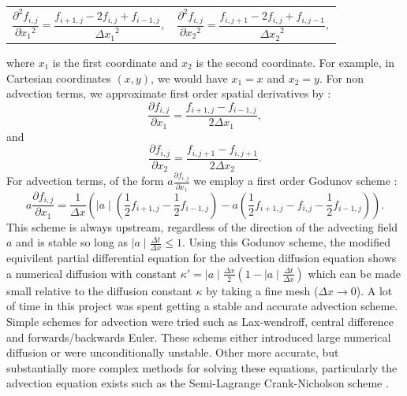 \documentclass{article}
\begin{document}
\begin{tabularx}{\textwidth}{XX}
\begin{equation}
	\frac{\partial^2 f_{i,j}}{\partial {x_1}^2} = \frac{f_{i+1,j} - 2 f_{i,j} + f_{i-1,j}}{{\Delta x_1}^2},
\end{equation}
    &
\begin{equation}
	\frac{\partial^2 f_{i,j}}{\partial {x_2}^2} = \frac{f_{i,j+1} - 2 f_{i,j} + f_{i,j-1}}{{\Delta x_2}^2},
\end{equation}
\end{tabularx}
where $x_1$ is the first coordinate and $x_2$ is the second coordinate. For example, in Cartesian coordinates $(x,y)$, we would have $x_1=x$ and $x_2=y$. 
For non advection terms, we approximate first order spatial derivatives by \cite{press1986numerical}:
\begin{equation}
	\frac{\partial f_{i,j}}{\partial x_1} = \frac{f_{i+1,j} - f_{i-1,j}}{2{\Delta x_1}},
\end{equation}
and
\begin{equation}
	\frac{\partial f_{i,j}}{\partial x_2} = \frac{f_{i,j+1} - f_{i,j+1}}{2{\Delta x_2}}.
\end{equation}
For advection terms, of the form $a \frac{\partial f_{i,j}}{\partial x_1}$ we employ a first order Godunov scheme \cite{godunov1959difference, guinot2003godunov}:
\begin{equation}
	a \frac{\partial f_{i,j}}{\partial x_1} = \frac{1}{\Delta x} ( \mid a\mid (  \frac{1}{2} f_{i+1,j} - \frac{1}{2} f_{i-1,j}   ) - a ( \frac{1}{2} f_{i+1,j} -f_{i,j} - \frac{1}{2} f_{i-1,j} )).
\end{equation}
This scheme is always upstream, regardless of the direction of the advecting field $a$ and is stable so long as $\mid a \mid \frac{\Delta t}{\Delta x} \leq 1$. Using this Godunov scheme, the modified equivilent partial differential equation for the advection diffusion equation shows a numerical diffusion with constant $\kappa' = \mid a \mid \frac{\Delta x}{2} (1 - \mid a \mid \frac{\Delta t}{\Delta x})$ which can be made small relative to the diffusion constant $\kappa$ by taking a fine mesh ($\Delta x \rightarrow 0$). 
\newline
A lot of time in this project was spent getting a stable and accurate advection scheme. Simple schemes for advection were tried such as Lax-wendroff, central difference and forwards/backwards Euler. These schems either introduced large numerical diffusion or were unconditionally unstable. Other more accurate, but substantially more complex methods for solving these equations, particularly the advection equation exists such as the Semi-Lagrange Crank-Nicholson scheme \cite{spiegelman2006semi}.
\end{document}
